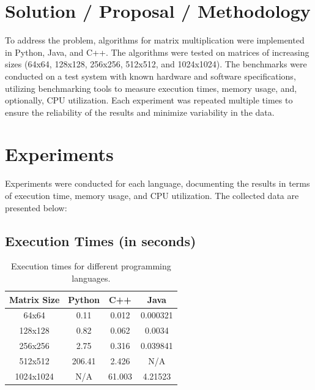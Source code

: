 \documentclass{article}
\begin{document}
\section{Solution / Proposal / Methodology}
To address the problem, algorithms for matrix multiplication were implemented in Python, Java, and C++. The algorithms were tested on matrices of increasing sizes (64x64, 128x128, 256x256, 512x512, and 1024x1024). The benchmarks were conducted on a test system with known hardware and software specifications, utilizing benchmarking tools to measure execution times, memory usage, and, optionally, CPU utilization. Each experiment was repeated multiple times to ensure the reliability of the results and minimize variability in the data.

\section{Experiments}
Experiments were conducted for each language, documenting the results in terms of execution time, memory usage, and CPU utilization. The collected data are presented below:

\subsection{Execution Times (in seconds)}
\begin{table}[h]
    \centering
    \begin{tabular}{@{}cccc@{}}
        \toprule
        Matrix Size & Python & C++    & Java   \\ \midrule
        64x64       & 0.11   & 0.012  & 0.000321 \\
        128x128     & 0.82   & 0.062  & 0.0034 \\
        256x256     & 2.75   & 0.316  & 0.039841 \\
        512x512     & 206.41 & 2.426  & N/A    \\
        1024x1024   & N/A    & 61.003 & 4.21523 \\ \bottomrule
    \end{tabular}
    \caption{Execution times for different programming languages.}
\end{table}
\end{document}
